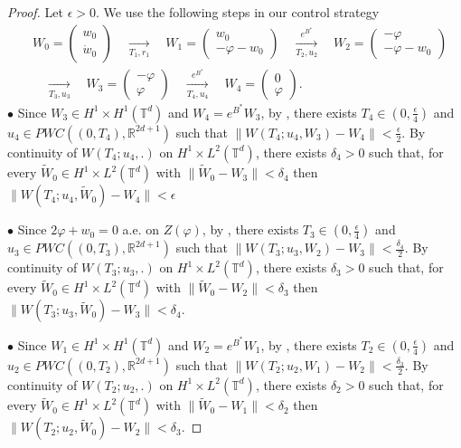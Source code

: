 \documentclass[a4paper]{article}
\theoremstyle{plain}
\newcommand{\T}{\mathbb{T}}
\newcommand{\R}{\mathbb{R}}
\begin{document}
\begin{proof}
Let $\epsilon>0$. We use the following steps in our control strategy
$$\begin{aligned}
& W_0=\begin{pmatrix}
    w_0 \\ \dot{w}_0
\end{pmatrix}
 \quad \xrightarrow[T_1,r_1]{} \quad
W_1=\begin{pmatrix}
    w_0 \\ - \varphi - w_0
\end{pmatrix}
\quad \xrightarrow[T_2,u_2]{e^{B^*}} \quad
W_2=\begin{pmatrix}
    -\varphi \\ -\varphi - w_0
\end{pmatrix}
\\ & 
\quad \xrightarrow[T_3,u_3]{} \quad
W_3=\begin{pmatrix}
    -\varphi \\ \varphi
\end{pmatrix}
\quad \xrightarrow[T_4,u_4]{e^{B^*}} \quad
W_4=\begin{pmatrix}
    0 \\ \varphi
\end{pmatrix}.
\end{aligned}$$
$\bullet$ Since $W_3 \in H^1 \times H^1(\T^d)$ and $W_4=e^{B^*}W_3$, by , there exists $T_4 \in (0,\frac{\epsilon}{4})$ and $u_4 \in PWC((0,T_4),\R^{2d+1})$
such that 
$\| W(T_4;u_4,W_3)-W_4\|<\frac{\epsilon}{2}$. By continuity of $W(T_4;u_4,.)$ on $H^1 \times L^2(\T^d)$, there exists $\delta_4>0$ such that, for every $\widetilde{W}_0 \in H^1 \times L^2(\T^d)$ with $\|\widetilde{W}_0-W_3\|<\delta_4$ then $\| W(T_4;u_4,\widetilde{W}_0)-W_4\|<\epsilon$

\medskip

\noindent $\bullet$ Since $2\varphi+w_0=0$ a.e. on $Z(\varphi)$, by , there exists $T_3 \in (0,\frac{\epsilon}{4})$ and\newline$u_3 \in PWC((0,T_3),\R^{2d+1})$ such that 
$\| W(T_3;u_3,W_2)-W_3\|<\frac{\delta_4}{2}$. By continuity of $W(T_3;u_3,.)$ on $H^1 \times L^2(\T^d)$, there exists $\delta_3>0$ such that, for every $\widetilde{W}_0 \in H^1 \times L^2(\T^d)$ with $\|\widetilde{W}_0-W_2\|<\delta_3$ then $\| W(T_3;u_3,\widetilde{W}_0)-W_3\|<\delta_4$.

\medskip

\noindent $\bullet$ Since $W_1 \in H^1 \times H^1(\T^d)$ and $W_2=e^{B^*}W_1$, by , there exists $T_2 \in (0,\frac{\epsilon}{4})$ and $u_2 \in PWC((0,T_2),\R^{2d+1})$
such that 
$\| W(T_2;u_2,W_1)-W_2\|<\frac{\delta_3}{2}$. By continuity of $W(T_2;u_2,.)$ on $H^1 \times L^2(\T^d)$, there exists $\delta_2>0$ such that, for every $\widetilde{W}_0 \in H^1 \times L^2(\T^d)$ with $\|\widetilde{W}_0-W_1\|<\delta_2$ then $\| W(T_2;u_2,\widetilde{W}_0)-W_2\|<\delta_3$.


\end{proof}
\end{document}
